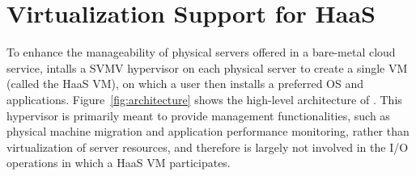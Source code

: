 \section{Virtualization Support for HaaS}



To enhance the manageability of physical servers offered in a bare-metal cloud service, \na intalls 
a SVMV  hypervisor on each physical server  to create a single VM (called the HaaS VM), on which 
a \na user then installs a preferred OS and applications. 
Figure~\ref{fig:architecture} shows the high-level architecture of \na.
This  hypervisor is primarily meant to provide management functionalities, such as 
physical machine migration and application performance monitoring, rather than virtualization 
of server resources, and therefore is largely not involved in the I/O operations in which a HaaS VM participates.

